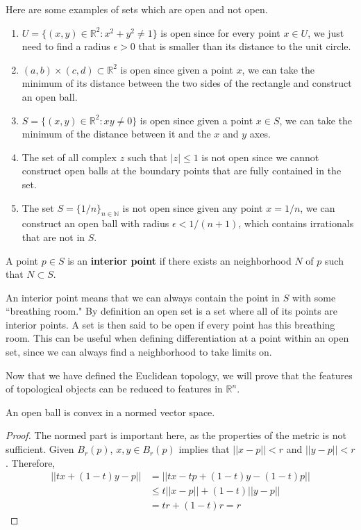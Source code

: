 \documentclass{article}
\begin{document}
    \begin{example}
      Here are some examples of sets which are open and not open. 
      \begin{enumerate}
        \item $U=\{(x,y)\in \mathbb{R}^2 : x^2+y^2 \neq 1\}$ is open since for every point $x \in U$, we just need to find a radius $\epsilon >0$ that is smaller than its distance to the unit circle. 
        \item $(a, b) \times (c, d) \subset \mathbb{R}^2$ is open since given a point $x$, we can take the minimum of its distance between the two sides of the rectangle and construct an open ball. 
        \item $S=\{(x,y)\in \mathbb{R}^2:xy\neq 0\}$ is open since given a point $x \in S$, we can take the minimum of the distance between it and the $x$ and $y$ axes. 
        \item The set of all complex $z$ such that $|z| \leq 1$ is not open since we cannot construct open balls at the boundary points that are fully contained in the set. 
        \item The set $S = \{1/n\}_{n \in \mathbb{N}}$ is not open since given any point $x = 1/n$, we can construct an open ball with radius $\epsilon < 1/(n+1)$, which contains irrationals that are not in $S$. 
      \end{enumerate}
    \end{example}

    \begin{definition}
      A point $p \in S$ is an \textbf{interior point} if there exists an neighborhood $N$ of $p$ such that $N \subset S$. 
    \end{definition}

    An interior point means that we can always contain the point in $S$ with some ``breathing room." By definition an open set is a set where all of its points are interior points. A set is then said to be open if every point has this breathing room. This can be useful when defining differentiation at a point within an open set, since we can always find a neighborhood to take limits on. 

    Now that we have defined the Euclidean topology, we will prove that the features of topological objects can be reduced to features in $\mathbb{R}^n$. 

    \begin{theorem}[Convexity]
      An open ball is convex in a normed vector space. 
    \end{theorem}
    \begin{proof}
      The normed part is important here, as the properties of the metric is not sufficient. Given $B_r (p)$, $x, y \in B_r (p)$ implies that $||x - p|| < r$ and $||y - p ||<r$. Therefore, 
      \begin{align}
        ||t x + (1 - t)y - p|| & = ||t x - tp + (1 - t) y - (1 - t) p|| \\
        & \leq t ||x - p|| + (1 - t) ||y - p|| \\
        & = t r + (1 - t) r = r 
      \end{align}
    \end{proof}
\end{document}
